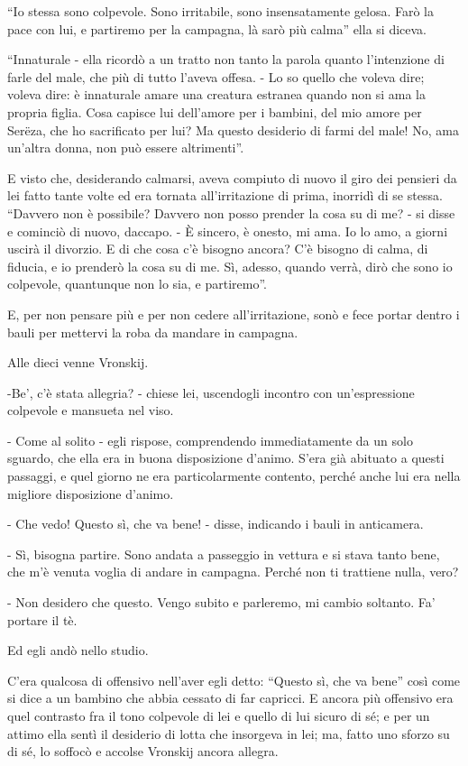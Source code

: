 ``Io stessa sono colpevole. Sono irritabile, sono insensatamente gelosa. Farò la pace con lui, e partiremo per la campagna, là sarò più calma'' ella si diceva. 

``Innaturale - ella ricordò a un tratto non tanto la parola quanto l'intenzione di farle del male, che più di tutto l'aveva offesa. - Lo so quello che voleva dire; voleva dire: è innaturale amare una creatura estranea quando non si ama la propria figlia. Cosa capisce lui dell'amore per i bambini, del mio amore per Serëza, che ho sacrificato per lui? Ma questo desiderio di farmi del male! No, ama un'altra donna, non può essere altrimenti''. 

E visto che, desiderando calmarsi, aveva compiuto di nuovo il giro dei pensieri da lei fatto tante volte ed era tornata all'irritazione di prima, inorridì di se stessa. ``Davvero non è possibile? Davvero non posso prender la cosa su di me? - si disse e cominciò di nuovo, daccapo. - È sincero, è onesto, mi ama. Io lo amo, a giorni uscirà il divorzio. E di che cosa c'è bisogno ancora? C'è bisogno di calma, di fiducia, e io prenderò la cosa su di me. Sì, adesso, quando verrà, dirò che sono io colpevole, quantunque non lo sia, e partiremo''. 

E, per non pensare più e per non cedere all'irritazione, sonò e fece portar dentro i bauli per mettervi la roba da mandare in campagna. 

Alle dieci venne Vronskij. 

-Be', c'è stata allegria? - chiese lei, uscendogli incontro con un'espressione colpevole e mansueta nel viso. 

- Come al solito - egli rispose, comprendendo immediatamente da un solo sguardo, che ella era in buona disposizione d'animo. S'era già abituato a questi passaggi, e quel giorno ne era particolarmente contento, perché anche lui era nella migliore disposizione d'animo. 

- Che vedo! Questo sì, che va bene! - disse, indicando i bauli in anticamera. 

- Sì, bisogna partire. Sono andata a passeggio in vettura e si stava tanto bene, che m'è venuta voglia di andare in campagna. Perché non ti trattiene nulla, vero? 

- Non desidero che questo. Vengo subito e parleremo, mi cambio soltanto. Fa' portare il tè. 

Ed egli andò nello studio. 

C'era qualcosa di offensivo nell'aver egli detto: ``Questo sì, che va bene'' così come si dice a un bambino che abbia cessato di far capricci. E ancora più offensivo era quel contrasto fra il tono colpevole di lei e quello di lui sicuro di sé; e per un attimo ella sentì il desiderio di lotta che insorgeva in lei; ma, fatto uno sforzo su di sé, lo soffocò e accolse Vronskij ancora allegra. 

